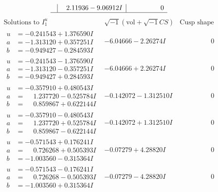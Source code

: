 \documentclass[1p]{elsarticle_modified}
\theoremstyle{definition}
\newcommand{\I}{\sqrt{-1}}
\begin{document}
$$\begin{array}{c|c|c}
 & \phantom{-}2.11936 - 9.06912 I & \phantom{-0.000000 } 0\\
 \hline 
 \end{array}$$\newpage$$\begin{array}{c|c|c}  
\text{Solutions to }I^u_{1}& \I (\text{vol} + \sqrt{-1}CS) & \text{Cusp shape}\\
 \hline 
\begin{aligned}
u &= -0.241543 + 1.376590 I \\
a &= -1.313120 + 0.357251 I \\
b &= -0.949427 - 0.284593 I\end{aligned}
 & -6.04666 - 2.26274 I & \phantom{-0.000000 } 0 \\ \hline\begin{aligned}
u &= -0.241543 - 1.376590 I \\
a &= -1.313120 - 0.357251 I \\
b &= -0.949427 + 0.284593 I\end{aligned}
 & -6.04666 + 2.26274 I & \phantom{-0.000000 } 0 \\ \hline\begin{aligned}
u &= -0.357910 + 0.480543 I \\
a &= \phantom{-}1.237720 - 0.525784 I \\
b &= \phantom{-}0.859867 + 0.622144 I\end{aligned}
 & -0.142072 - 1.312510 I & \phantom{-0.000000 } 0 \\ \hline\begin{aligned}
u &= -0.357910 - 0.480543 I \\
a &= \phantom{-}1.237720 + 0.525784 I \\
b &= \phantom{-}0.859867 - 0.622144 I\end{aligned}
 & -0.142072 + 1.312510 I & \phantom{-0.000000 } 0 \\ \hline\begin{aligned}
u &= -0.571543 + 0.176241 I \\
a &= \phantom{-}0.726268 + 0.505393 I \\
b &= -1.003560 - 0.315364 I\end{aligned}
 & -0.07279 + 4.28820 I & \phantom{-0.000000 } 0 \\ \hline\begin{aligned}
u &= -0.571543 - 0.176241 I \\
a &= \phantom{-}0.726268 - 0.505393 I \\
b &= -1.003560 + 0.315364 I\end{aligned}
 & -0.07279 - 4.28820 I & \phantom{-0.000000 } 0 \\ \hline\begin{aligned}

\end{aligned}
\end{array}$$
\end{document}

